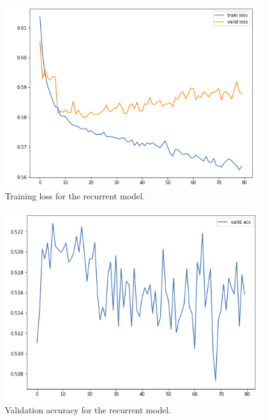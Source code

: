\documentclass[a4paper]{article}
\begin{document}
\begin{figure} 
\includegraphics[scale=0.35]{img/loss2.png}
\caption{Training loss for the recurrent model. }
\label{fig:rnnloss}
\end{figure}
\begin{figure} 
\includegraphics[scale=0.35]{img/acc_exp2.png}
\caption{Validation accuracy for the recurrent model. }
\label{fig:rnnacc}
\end{figure}
\end{document}
